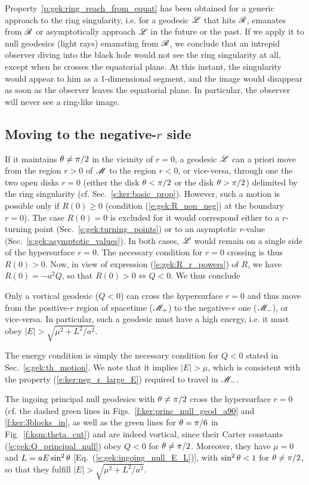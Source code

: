 Property~\ref{p:gek:ring_reach_from_equat}
has been obtained for a generic approach to the ring singularity,
i.e. for a geodesic $\mathscr{L}$ that hits $\mathscr{R}$, emanates from $\mathscr{R}$ or
asymptotically approach $\mathscr{L}$ in the future or the past. If we apply it to
null geodesics (light rays) emanating from $\mathscr{R}$, we conclude that an intrepid observer
diving into the black hole would not see the ring singularity at all, except when
he crosses the equatorial plane. At this instant, the singularity would appear
to him as a 1-dimensional segment, and the image would disappear as soon as the observer
leaves the equatorial plane. In particular, the observer will never see a ring-like image.


\subsection{Moving to the negative-$r$ side}

If it maintains $\theta\neq \pi/2$ in the vicinity of $r=0$, a geodesic $\mathscr{L}$ can a priori
move from the region $r>0$ of $\mathscr{M}$ to the region $r<0$, or vice-versa, through one the
two open disks $r=0$ (either the disk $\theta < \pi/2$ or the disk $\theta>\pi/2$)
delimited by the ring singularity (cf. Sec.~\ref{s:ker:basic_prop}). However,
such a motion is possible only if $R(0) \geq 0$ (condition (\ref{e:gek:R_non_neg}) at the
boundary $r=0$).
The case $R(0) = 0$ is excluded for it would correspond either to a
$r$-turning point (Sec.~\ref{s:gek:turning_points}) or to an asymptotic $r$-value (Sec.~\ref{s:gek:asymptotic_values}). In both cases, $\mathscr{L}$ would remain on a single side of the hypersurface
$r=0$. The necessary condition for $r=0$ crossing is thus $R(0)> 0$. Now, in view of expression (\ref{e:gek:R_r_powers}) of $R$,
we have $R(0) = - a^2 Q$, so that $R(0)> 0 \iff Q < 0$. We thus conclude
\begin{prop}[crossing $r=0$ only possible for vortical geodesics]
Only a vortical geodesic ($Q<0$) can cross the hypersurface $r=0$ and thus move from the positive-$r$ region of spacetime ($\mathscr{M}_+$) to the negative-$r$ one ($\mathscr{M}_-$), or vice-versa. In particular, such a geodesic must have
a high energy, i.e. it must obey $|E| > \sqrt{\mu^2 + L^2/a^2}$.
\end{prop}
The energy condition is simply the necessary condition for $Q < 0$ stated
in Sec.~\ref{s:gek:th_motion}. We note that it implies $|E| > \mu$, which
is consistent with the property (\ref{e:ker:neg_r_large_E}) required to travel in $\mathscr{M}_-$.

\begin{example}
The ingoing principal null geodesics with $\theta\neq \pi/2$ cross
the hypersurface $r=0$ (cf. the dashed green lines in Figs.~\ref{f:ker:princ_null_geod_a90}
and \ref{f:ker:3blocks_in}, as well as the green lines for $\theta=\pi/6$ in
Fig.~\ref{f:ksm:theta_cut}) and  are indeed vortical,
since their Carter constants (\ref{e:gek:Q_principal_null}) obey $Q<0$ for $\theta\neq \pi/2$.
Moreover, they have $\mu=0$ and $L = a E \sin^2\theta$ [Eq.~(\ref{e:gek:ingoing_null_E_L})],
with $\sin^2\theta < 1$ for $\theta\neq \pi/2$,
so that they fulfill $|E| > \sqrt{\mu^2 + L^2/a^2}$.
\end{example}

